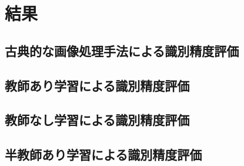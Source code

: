 \chapter{結果}\label{chap_result}

\section{古典的な画像処理手法による識別精度評価}


\section{教師あり学習による識別精度評価}



\section{教師なし学習による識別精度評価}

\section{半教師あり学習による識別精度評価}

